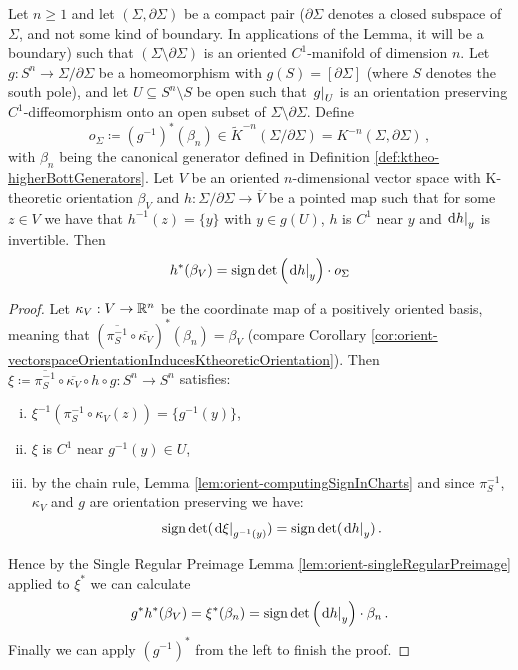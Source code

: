 \begin{lemma}\label{lem:morseFiltr-orientationClassOfADisk}
	Let $n\geq 1$ and let $(\Sigma,\partial \Sigma)$ be a compact pair ($\partial \Sigma$ denotes a closed subspace of $\Sigma$, and not some kind of boundary. In applications of the Lemma, it will be a boundary) such that $(\Sigma \setminus \partial \Sigma)$ is an oriented $C^1$-manifold of dimension $n$. Let $g:S^n\to \Sigma \big/ \partial \Sigma$ be a homeomorphism with $g(S)=[\partial \Sigma]$ (where $S$ denotes the south pole), and let $U\subseteq S^n\setminus S$ be open such that $\left.g\right|_{U}$ is an orientation preserving $C^1$-diffeomorphism onto an open subset of $\Sigma \setminus \partial \Sigma$. Define
	\begin{equation*}
		o_{\Sigma}\coloneq (g^{-1})^*(\beta_n)\in\tilde{K}^{-n}(\Sigma /\partial \Sigma)= K^{-n}(\Sigma , \partial \Sigma)\,,
	\end{equation*} with $\beta_n$ being the canonical generator defined in Definition \ref{def:ktheo-higherBottGenerators}. Let $V$ be an oriented $n$-dimensional vector space with K-theoretic orientation $\beta_V$ and $h:\Sigma / \partial \Sigma \to \overline{V}$ be a pointed map such that for some $z\in V$ we have that $h^{-1}(z)=\{y\}$ with $y\in g(U)$, $h$ is $C^1$ near $y$ and $\left.\mathop{}\!\mathrm{d} h\right|_{y}$ is invertible. Then
	\begin{equation*}
		h^*(\beta_V)=\mathrm{sign}\det\left(\left.\mathop{}\!\mathrm{d} h\right|_{y}\right)\cdot o_{\Sigma}
	\end{equation*} 
\end{lemma}
\begin{proof}
	Let $\kappa_V:V\to \mathbb{R}^n$ be the coordinate map of a positively oriented basis, meaning that $\left(\overline{\pi_S^{-1}}\circ \overline{\kappa_V}\right)^*(\beta_n)=\beta_V$ (compare Corollary \ref{cor:orient-vectorspaceOrientationInducesKtheoreticOrientation}). Then $\xi\coloneq \overline{\pi_S^{-1}}\circ \overline{\kappa_V}\circ h \circ g:S^n\to S^n$ satisfies:
	\begin{enumerate}[(i)]
		\item $\xi^{-1}(\pi_S^{-1}\circ \kappa_V(z))=\{g^{-1}(y)\}$,
		\item $\xi$ is $C^1$ near $g^{-1}(y)\in U$, 
		\item by the chain rule, Lemma \ref{lem:orient-computingSignInCharts} and since $\pi_S^{-1}$, $\kappa_V$ and $g$ are orientation preserving we have:
		\begin{equation*}
			\mathrm{sign} \det(\left.\mathop{}\!\mathrm{d} \xi\right|_{g^{-1}(y)})=\mathrm{sign} \det (\left.\mathop{}\!\mathrm{d} h\right|_{y})\,.
		\end{equation*}
	\end{enumerate}
	Hence by the Single Regular Preimage Lemma \ref{lem:orient-singleRegularPreimage} applied to $\xi^*$ we can calculate
	\begin{equation*}
		g^*h^*(\beta_V)=\xi^*(\beta_n)=\mathrm{sign} \det \left(\left.\mathop{}\!\mathrm{d} h\right|_{y}\right)\cdot \beta_n\,.
	\end{equation*} Finally we can apply $(g^{-1})^*$ from the left to finish the proof.
\end{proof}
